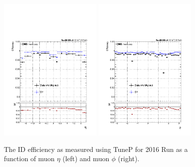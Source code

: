 \begin{figure}[htbp]
\centering
\includegraphics[width=0.45\textwidth]{Images/Cap5/Eff_FinalSel_Iso0p1_B2H_NoBkgSub_NoZwinNorm_Eta.pdf}
\includegraphics[width=0.45\textwidth]{Images/Cap5/Eff_FinalSel_Iso0p1_B2H_NoBkgSub_NoZwinNorm_Phi.pdf}
\caption{\label{fig:IDEffVsEtaPhi} The ID efficiency as measured using TuneP for 2016 Run as a function of muon $\eta$ (left) and muon $\phi$ (right).}
\end{figure}

